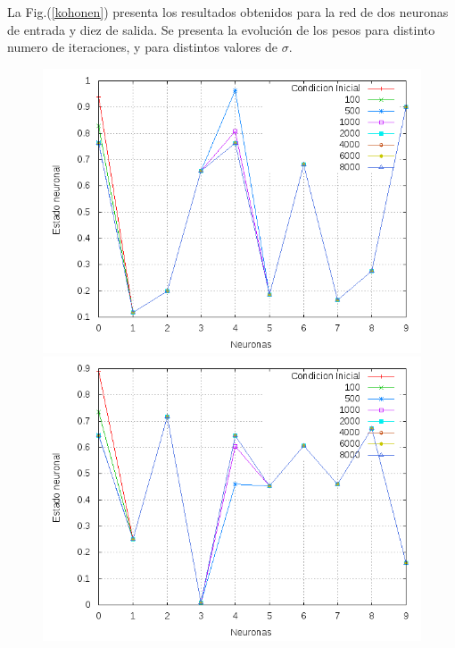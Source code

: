 \documentclass[aps,prb,onecolumn,10pt,floatfix,superscriptaddress]{article} %
\begin{document}
La Fig.(\ref{kohonen}) presenta los resultados obtenidos para la red de dos neuronas de entrada y diez de salida. Se presenta la evoluci\'on de los pesos para distinto numero de iteraciones, y para distintos valores de $\sigma$.
 
\begin{figure}[!htd] 
	\begin{minipage}[b]{0.450\linewidth}
	   	    \begin{center}
   	    \includegraphics[scale=0.32 ]{sigma01_1.png}
     	    \end{center}
   \end{minipage}
   \begin{minipage}[b]{0.450\linewidth}
      	     \begin{center}
   	    \includegraphics[scale=0.32 ]{sigma01_2.png}

\end{center}
\end{minipage}
\end{figure}
\end{document}
